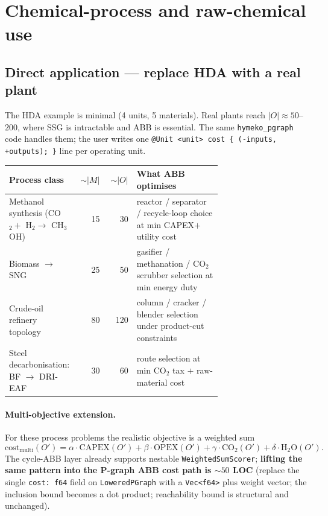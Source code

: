 \documentclass[11pt,a4paper]{article}
\newcommand{\code}[1]{\texttt{\small #1}}
\begin{document}
\section{Chemical-process and raw-chemical use}

\subsection{Direct application --- replace HDA with a real plant}

The HDA example is minimal (4 units, 5 materials). Real plants reach
$|O| \approx 50$--$200$, where SSG is intractable and ABB is essential.
The same \code{hymeko\_pgraph} code handles them; the user writes one
\code{@Unit <unit> cost \{ (-inputs, +outputs); \}} line per operating
unit.

\begin{center}\small
\begin{tabular}{p{0.30\linewidth}rrp{0.40\linewidth}}
\toprule
Process class                                            & $\sim |M|$ & $\sim |O|$ & What ABB optimises \\
\midrule
Methanol synthesis (CO$_2 +$ H$_2 \to$ CH$_3$OH)          & 15  & 30  & reactor / separator / recycle-loop choice at min CAPEX$+$utility cost \\
Biomass $\to$ SNG                                         & 25  & 50  & gasifier / methanation / CO$_2$ scrubber selection at min energy duty \\
Crude-oil refinery topology                               & 80  & 120 & column / cracker / blender selection under product-cut constraints \\
Steel decarbonisation: BF $\to$ DRI-EAF                   & 30  & 60  & route selection at min CO$_2$ tax $+$ raw-material cost \\
\bottomrule
\end{tabular}
\end{center}

\paragraph{Multi-objective extension.} For these process problems the
realistic objective is a weighted sum
\[
\mathrm{cost}_{\mathrm{multi}}(O')
   = \alpha \cdot \mathrm{CAPEX}(O')
   + \beta \cdot \mathrm{OPEX}(O')
   + \gamma \cdot \mathrm{CO}_2(O')
   + \delta \cdot \mathrm{H}_2\mathrm{O}(O').
\]
The cycle-ABB layer already supports nestable \code{WeightedSumScorer};
\textbf{lifting the same pattern into the P-graph ABB cost path is
$\sim 50$ LOC} (replace the single \code{cost: f64} field on
\code{LoweredPGraph} with a \code{Vec<f64>} plus weight vector; the
inclusion bound becomes a dot product; reachability bound is
structural and unchanged).
\end{document}
